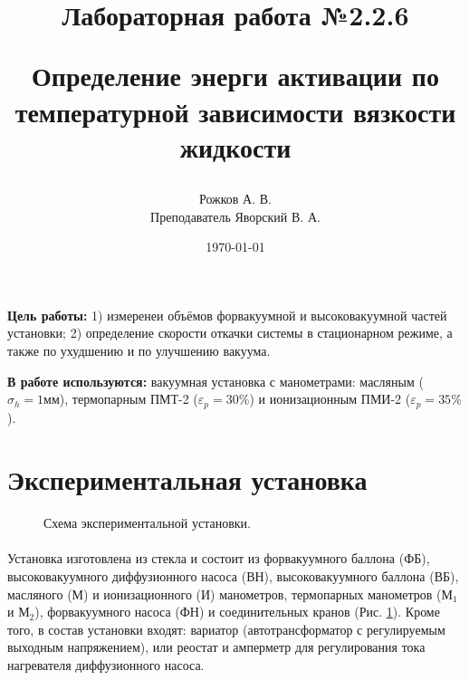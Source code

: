 \documentclass[a4paper, 12pt]{article}
\title{\begin{center}Лабораторная работа №2.2.6\end{center}
Определение энерги активации по температурной зависимости вязкости жидкости}
\author{Рожков А. В. \\ Преподаватель Яворский В. А.}
\date{\today}
\begin{document}
    \maketitle
    \newpage

    \textbf{Цель работы:} 1) измеренеи объёмов форвакуумной и высоковакуумной частей установки; 2) определение скорости откачки системы в стационарном режиме, а также по ухудшению и по улучшению вакуума.

    \textbf{В работе используются:} вакуумная установка с манометрами: масляным ($\sigma_h = 1 мм$), термопарным ПМТ-2 ($\varepsilon_{p} = 30\%$) и ионизационным ПМИ-2 ($\varepsilon_{p} = 35\%$).

    \section{Экспериментальная установка}

    \begin{figure}[h]
        \caption{Схема экспериментальной установки.}
        \label{ris:ustanovka}
    \end{figure}

    \paragraph{}
    Установка изготовлена из стекла и состоит из форвакуумного баллона (ФБ), высоковакуумного диффузионного насоса (ВН), высоковакуумного баллона (ВБ), масляного (М) и ионизационного (И) манометров, термопарных манометров ($М_1$ и $М_2$), форвакуумного насоса (ФН) и соединительных кранов (Рис. \ref{ris:ustanovka}). Кроме того, в состав установки входят: вариатор (автотрансформатор с регулируемым выходным напряжением), или реостат и амперметр для регулирования тока нагревателя диффузионного насоса.
\end{document}
